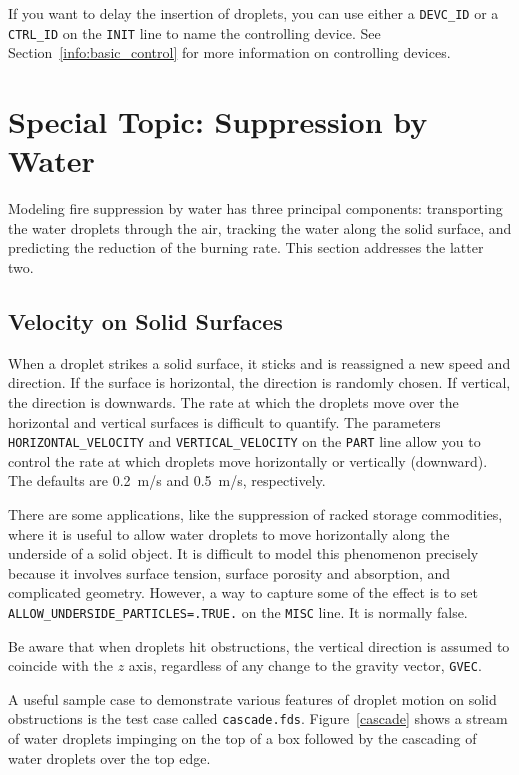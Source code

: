 \documentclass[11pt]{book}
\newcommand{\ct}{\tt\small}
\begin{document}
If you want to delay the insertion of droplets, you can use either a {\ct DEVC\_ID} or a {\ct CTRL\_ID} on the {\ct INIT} line to name the controlling device.
See Section~\ref{info:basic_control} for more information on controlling devices.

\clearpage

\section{Special Topic: Suppression by Water}
\label{info:suppression}

Modeling fire suppression by water has three principal components: transporting the water droplets through the air, tracking the water along the solid surface, and predicting the reduction of the burning rate. This section addresses the latter two.


\subsection{Velocity on Solid Surfaces}
\label{info:surface_droplets}

When a droplet strikes a solid surface, it sticks and is reassigned a new speed and direction. If the surface is
horizontal, the direction is randomly chosen. If vertical, the direction is downwards.
The rate at which the droplets move over the horizontal and vertical surfaces is difficult to
quantify. The parameters {\ct HORIZONTAL\_VELOCITY} and {\ct VERTICAL\_VELOCITY} on the {\ct PART} line
allow you to control the rate at which droplets move horizontally or vertically (downward). The defaults are
0.2~m/s and 0.5~m/s, respectively.

There are some applications, like the suppression of racked storage commodities, where it is useful to allow water droplets to move horizontally
along the underside of a solid object. It is difficult to model this phenomenon precisely because it involves surface tension, surface porosity and
absorption, and complicated geometry. However, a way to capture some of the effect is to set {\ct ALLOW\_UNDERSIDE\_PARTICLES=.TRUE.} on the
{\ct MISC} line. It is normally false.

\begin{warning}
Be aware that when droplets hit obstructions, the vertical direction is assumed to coincide with the $z$ axis, regardless of any change to the gravity vector, {\ct GVEC}.
\end{warning}

\noindent
A useful sample case to demonstrate various features of droplet motion on solid obstructions is the test case called {\ct cascade.fds}. Figure~\ref{cascade} shows a stream
of water droplets impinging on the top of a box followed by the cascading of water droplets over the top edge.
\end{document}
